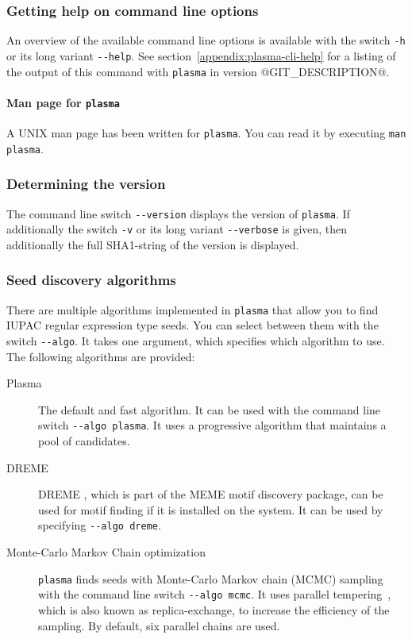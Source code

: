 \documentclass[a4paper]{article}
\makeatletter
\newcommand{\plasma}[0]{\texttt{plasma}}
\newcommand{\version}[0]{@GIT_DESCRIPTION@}
\makeatother
\begin{document}
\subsubsection{Getting help on command line options}
An overview of the available command line options is available with the switch \verb|-h| or its long variant \verb|--help|.
See section~\ref{appendix:plasma-cli-help} for a listing of the output of this command with \plasma{} in version \version{}.

\paragraph{Man page for \plasma{}}
A UNIX man page has been written for \plasma{}.
You can read it by executing \verb|man plasma|.

\subsubsection{Determining the version}
The command line switch \verb|--version| displays the version of \plasma{}.
If additionally the switch \verb|-v| or its long variant \verb|--verbose| is given, then additionally the full SHA1-string of the version is displayed.

\subsubsection{Seed discovery algorithms}
\label{section:plasma-MCMC}
There are multiple algorithms implemented in \plasma{} that allow you to find IUPAC regular expression type seeds.
You can select between them with the switch \verb|--algo|.
It takes one argument, which specifies which algorithm to use.
The following algorithms are provided:
\begin{description}
  \item[Plasma]
    The default and fast algorithm.
    It can be used with the command line switch \verb|--algo plasma|.
    It uses a progressive algorithm that maintains a pool of candidates.
  \item[DREME]
    DREME \cite{Bailey2011}, which is part of the MEME motif discovery package, can be used for motif finding if it is installed on the system.
    It can be used by specifying \verb|--algo dreme|.
  \item[Monte-Carlo Markov Chain optimization]
    \plasma{} finds seeds with Monte-Carlo Markov chain (MCMC) sampling with the command line switch \verb|--algo mcmc|.
    It uses parallel tempering~\cite{Earl2005}, which is also known as replica-exchange, to increase the efficiency of the sampling.
    By default, six parallel chains are used.
\end{description}
\end{document}
